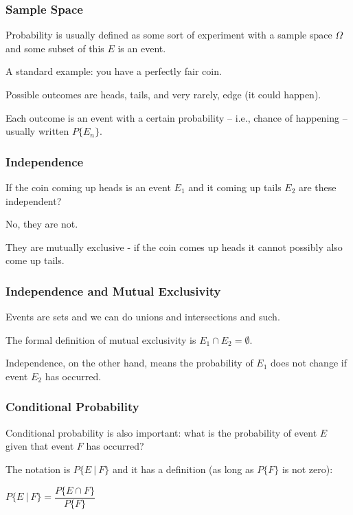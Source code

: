 \begin{frame}
\frametitle{Sample Space}

Probability is usually defined as some sort of experiment with a sample space $\Omega$ and some subset of this $E$ is an \alert{event}. 

A standard example: you have a perfectly fair coin. 

Possible outcomes are heads, tails, and very rarely, edge (it could happen). 

Each outcome is an event with a certain probability -- i.e., chance of happening -- usually written $P\{E_{n}\}$.


\end{frame}



\begin{frame}
\frametitle{Independence}

If the coin coming up heads is an event $E_{1}$ and it coming up tails $E_{2}$ are these independent? 

No, they are not. 

They are mutually exclusive - if the coin comes up heads it cannot possibly also come up tails. 


\end{frame}



\begin{frame}
\frametitle{Independence and Mutual Exclusivity}

Events are sets and we can do unions and intersections and such. 

The formal definition of mutual exclusivity is $E_{1} \cap E_{2} = \emptyset$. 

Independence, on the other hand, means the probability of $E_{1}$ does not change if event $E_{2}$ has occurred.


\end{frame}



\begin{frame}
\frametitle{Conditional Probability}

Conditional probability is also important: what is the probability of event $E$ given that event $F$ has occurred? 

The notation is $P\{ E~|~F \}$ and it has a definition (as long as $P\{F\}$ is not zero): 

\begin{center}
	$P\{E~|~F\} = \dfrac{P\{E \cap F\}}{P\{F\}}$
\end{center}

\end{frame}



